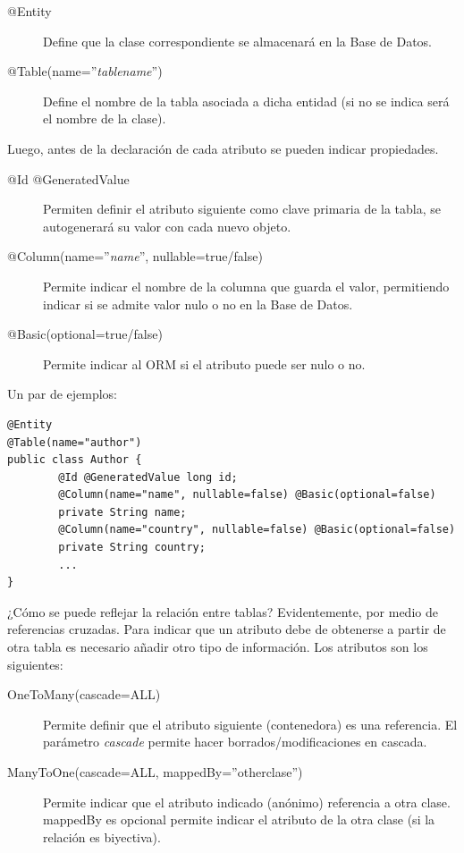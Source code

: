\documentclass[11pt]{article}
\begin{document}
\begin{description}
\item[@Entity] Define que la clase correspondiente se almacenará en la Base de Datos.
\item[@Table(name=''\emph{tablename}'')] Define el nombre de la tabla asociada a dicha entidad (si no se indica
  será el nombre de la clase).
\end{description}


Luego, antes de la declaración de cada atributo se pueden indicar propiedades.




\begin{description}
\item[@Id @GeneratedValue] Permiten definir el atributo siguiente como clave primaria de la tabla, se
     autogenerará su valor con cada nuevo objeto.
\item[@Column(name=''\emph{name}'', nullable=true/false)] Permite indicar el nombre de la columna que
     guarda el valor, permitiendo indicar si se admite valor nulo o no en la Base de Datos.
\item[@Basic(optional=true/false)] Permite indicar al ORM si el atributo puede ser nulo o no.
\end{description}


Un par de ejemplos:


\begin{lstlisting}
@Entity
@Table(name="author")
public class Author {
        @Id @GeneratedValue long id;
        @Column(name="name", nullable=false) @Basic(optional=false)
        private String name;
        @Column(name="country", nullable=false) @Basic(optional=false)
        private String country;
        ...
}
\end{lstlisting}




¿Cómo se puede reflejar la relación entre tablas? Evidentemente, por medio de referencias cruzadas. Para
indicar que un atributo debe de obtenerse a partir de otra tabla es necesario añadir otro tipo de información. 
Los atributos son los siguientes:




\begin{description}
\item[OneToMany(cascade=ALL)] Permite definir que el atributo siguiente (contenedora) es una
     referencia. El parámetro \emph{cascade} permite hacer borrados/modificaciones en cascada.
\item[ManyToOne(cascade=ALL, mappedBy=''otherclase'')] Permite indicar que el atributo indicado
     (anónimo) referencia a otra clase. mappedBy es opcional permite indicar el atributo de la otra
     clase (si la relación es biyectiva).
\end{description}
\end{document}
